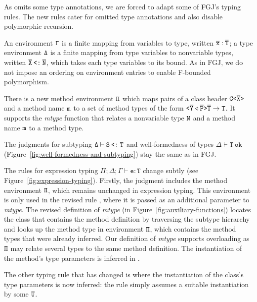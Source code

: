 As \TFGJ omits some type annotations, we are forced to adapt some of 
FGJ's typing rules. The new rules cater for omitted type annotations
and also disable polymorphic recursion.

An environment ${\tt \Gamma}$ is a finite mapping from variables to type,
written $\overline{\tt x}:\overline{\tt T}$; a type environment ${\tt \Delta}$ is a finite mapping
from type variables to nonvariable types, written $\overline{\tt X}\mathbin{\texttt{<:}}\overline{\tt N}$, which takes each type variables to its bound. As in FGJ, we do not
impose an ordering on environment entries to enable F-bounded
polymorphism.

There is a new method environment ${\tt \Pi}$ which maps pairs of a class header
$\mathtt{C \texttt{<} \overline{\tt X} \texttt{>} }$ and a method name ${\tt m}$ to a set of method
types of the form $\mathtt{ \texttt{<} \overline{\tt Y} \triangleleft  \overline{\tt P} \texttt{>} } \overline{\tt T} \to {\tt T}$. 
It supports the \textit{mtype} function that relates a nonvariable type
${\tt N}$ and a method name ${\tt m}$ to a method type.

The judgments for subtyping $\mathtt{\Delta \vdash S \mathbin{\texttt{<:}} T}$ and
well-formedness of types $\mathtt{\Delta \vdash T\ \mathtt{ok}}$
(Figure~\ref{fig:well-formedness-and-subtyping}) stay the same as in
FGJ.

The rules for expression typing $\mathtt{\Pi; \Delta; \Gamma \vdash e
  : T}$ change subtly (see
Figure~\ref{fig:expression-typing}). Firstly, the judgment includes
the method 
environment ${\tt \Pi}$, which remains unchanged in expression
typing. This environment is only used in the revised rule
, where it is passed as an additional parameter to
\textit{mtype}. The revised definition of \textit{mtype} (in
Figure~\ref{fig:auxiliary-functions}) locates the class that contains
the method definition by traversing the subtype hierarchy and looks up the
method type in environment ${\tt \Pi}$, which contains the method types
that were already inferred. Our definition of \textit{mtype} supports
overloading as ${\tt \Pi}$ may relate several types to the same method
definition. The instantiation of the method's type parameters is
inferred in \TFGJ.

The other typing rule that has changed is  where the
instantiation of the class's type parameters is now inferred: the rule
simply assumes a suitable instantiation by some $\overline{\tt U}$.



